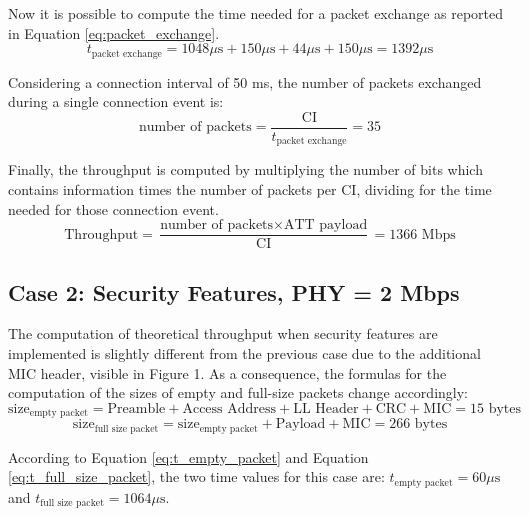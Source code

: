\documentclass{Configuration_Files/PoliMi3i_thesis}
\begin{document}
Now it is possible to compute the time needed for a packet exchange as reported in Equation \ref{eq:packet_exchange}.
\begin{equation}
t_{\text{packet exchange}} = 1048 \mu \text{s} + 150 \mu \text{s} + 44 \mu \text{s} + 150 \mu \text{s} = 1392 \mu \text{s}
\label{eq:packet_exchange_case1}
\end{equation}

Considering a connection interval of 50 ms, the number of packets exchanged during a single connection event is:
\begin{equation}
\text{number of packets} = \frac{\text{CI}}{t_{\text{packet exchange}}} = 35
\label{eq:number_of_packets_case1}
\end{equation}

Finally, the throughput is computed by multiplying the number of bits which contains information times the number of packets per CI, dividing for the time needed for those connection event.
\begin{equation}
\text{Throughput} = \frac{\text{number of packets} \times \text{ATT payload}}{\text{CI}} = 1366 \text{ Mbps}
\label{eq:throughput_case1}
\end{equation}

\subsection*{Case 2: Security Features, PHY = 2 Mbps}

The computation of theoretical throughput when security features are implemented is slightly different from the previous case due to the additional MIC header, visible in Figure 1. As a consequence, the formulas for the computation of the sizes of empty and full-size packets change accordingly:
\begin{equation}
\text{size}_{\text{empty packet}} = \text{Preamble} + \text{Access Address} + \text{LL Header} + \text{CRC} + \text{MIC} = 15 \text{ bytes}
\label{eq:size_empty_packet_case2}
\end{equation}
\begin{equation}
\text{size}_{\text{full size packet}} = \text{size}_{\text{empty packet}} + \text{Payload} + \text{MIC} = 266 \text{ bytes}
\label{eq:size_full_size_packet_case2}
\end{equation}

According to Equation \ref{eq:t_empty_packet} and Equation \ref{eq:t_full_size_packet}, the two time values for this case are: $t_{\text{empty packet}} = 60 \mu \text{s}$ and $t_{\text{full size packet}} = 1064 \mu \text{s}$.
\end{document}
